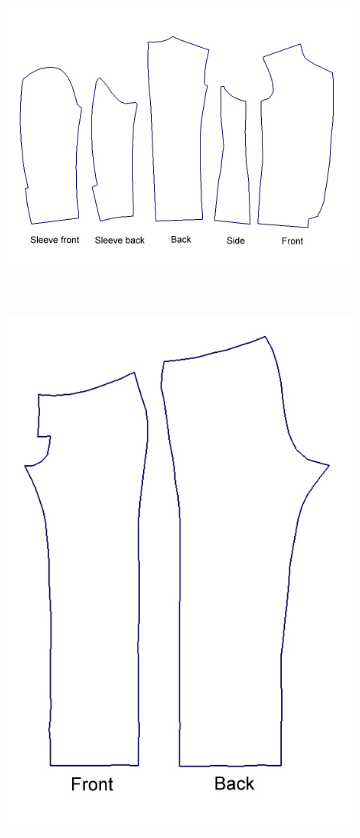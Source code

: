 \begin{figure}[H]
        \centering
        \begin{subfigure}[b]{0.7\textwidth}
                \includegraphics[width=\textwidth]{../images/shirt_pattern}
                \caption{}
                \label{fig:subjectA}
        \end{subfigure}%
        ~ %
        \begin{subfigure}[b]{0.3\textwidth}
                \includegraphics[width=\textwidth]{../images/trousers_pattern}

\end{subfigure}
\end{figure}
